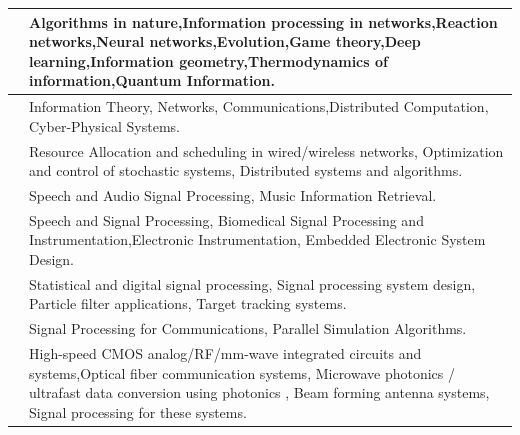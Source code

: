 \documentclass[openany]{book} %
\begin{document}
\begin{tabular}{p{4.5cm} p{9cm}}
\hline 

\href{https://www.ee.iitb.ac.in/~manojg/}{\color{blue}{Prof. Manoj Gopalkrishnan}} & Algorithms in nature,Information processing in networks,Reaction networks,Neural networks,Evolution,Game theory,Deep learning,Information geometry,Thermodynamics of information,Quantum Information.\\ 
\hline 

\href{https://sites.google.com/site/nikhilkaram/}{\color{blue}{Prof. Nikhil Karamchandani }} & Information Theory, Networks, Communications,Distributed Computation, Cyber-Physical Systems. \\ 
\hline 

\href{https://www.ee.iitb.ac.in/wiki/faculty/chaporkar}{\color{blue}{Prof. Prasanna Chaporkar }} & Resource Allocation and scheduling in wired/wireless networks, Optimization and control of stochastic systems, Distributed systems and algorithms. \\ 
\hline

\href{https://www.ee.iitb.ac.in/wiki/faculty/prao}{\color{blue}{Prof. Preeti Rao }} & Speech and Audio Signal Processing, Music Information Retrieval. \\ \hline 

\href{https://www.ee.iitb.ac.in/~pcpandey/}{\color{blue}{Prof. Prem C. Pandey }} & Speech and Signal Processing, Biomedical Signal Processing and Instrumentation,Electronic Instrumentation, Embedded Electronic System Design. \\ 
\hline 

\href{https://www.ee.iitb.ac.in/web/faculty/homepage/rajbabu}{\color{blue}{Prof. Rajbabu Velmurugan }} & Statistical and digital signal processing, Signal processing system design, Particle filter applications, Target tracking systems. \\ 
\hline 

\href{https://www.ee.iitb.ac.in/~sarva/}{\color{blue}{Prof. Saravanan Vijayakumaran}} & Signal Processing for Communications, Parallel Simulation Algorithms. \\ 
\hline 


\href{https://www.ee.iitb.ac.in/wiki/faculty/shalabh}{\color{blue}{Prof. Shalabh Gupta}} & High-speed CMOS analog/RF/mm-wave integrated circuits and systems,Optical fiber communication systems, Microwave photonics / ultrafast data  conversion using photonics , Beam forming antenna systems, Signal processing for these systems. \\ 
\hline 


\end{tabular}
\end{document}
